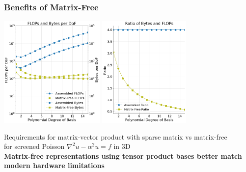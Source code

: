 \documentclass{beamer}
\begin{document}
\begin{frame}
\begin{center}
\frametitle{Benefits of Matrix-Free}

\includegraphics[height=5.5cm]{../img/assembledVsMatrixFree_tall}
\hspace{1cm}
\includegraphics[height=5.5cm]{../img/assembledVsMatrixFreeBalance_tall}

{\small Requirements for matrix-vector product with sparse matrix vs matrix-free\\ for screened Poisson $\nabla^2 u - \alpha^2 u = f$ in 3D}\\

{\bf Matrix-free representations using tensor product bases better match modern hardware limitations}

\end{center}
\end{frame}

\end{document}
